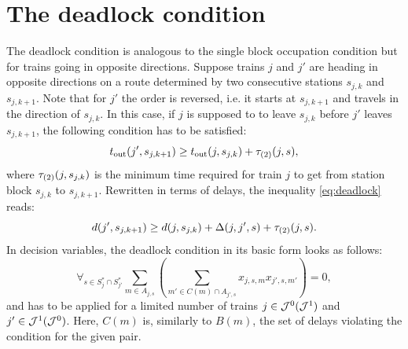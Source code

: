 \section{The deadlock condition}
The deadlock condition is analogous to the single block occupation condition
but for trains going in opposite directions. Suppose trains $j$ and $j'$ are
heading in opposite directions on a route determined by two consecutive
stations $s_{j,k}$ and $s_{j,k+1}$. Note that for $j'$ the order is reversed, i.e. it
starts at $s_{j,k+1}$ and travels in the direction of $s_{j,k}$. In this case, if $j$
is supposed to to leave $s_{j,k}$ before $j'$ leaves $s_{j,k+1}$, the following
condition has to be satisfied:
\begin{equation}
  \label{eq:deadlock}
  t_\text{out}(j', s_{j,k+1}) \ge t_\text{out}(j,s_{j,k}) + \tau_{(2)}(j, s),
\end{equation}
where $\tau_{(2)}(j, s_{j,k})$ is the minimum time required for train $j$ to
get from station block $s_{j,k}$ to $s_{j,k+1}$. Rewritten in terms of delays, the
inequality \eqref{eq:deadlock} reads:
\begin{equation}
  \label{eq:deadlock2}
  d(j',s_{j,k+1}) \ge d(j, s_{j,k}) + \Delta(j,j',s) + \tau_{(2)}(j, s).
\end{equation}
In decision variables, the deadlock condition in its basic form looks as
follows:
\begin{equation}
  \label{eq:qubo:deadlock}
  \forall_{s \in S^{*}_{j} \cap S^{*}_{j'}} \sum_{m \in A_{j, s}} \left(
  \sum_{m' \in C(m) \cap A_{j', s}} x_{j,s,m}x_{j',s,m'}
  \right) = 0,
\end{equation}
and has to be applied for a limited number of trains $j \in \mathcal{J}^{0} (\mathcal{J}^{1})$
and $j' \in \mathcal{J}^{1}(\mathcal{J}^{0})$. Here, $C(m)$ is, similarly to $B(m)$, the set of delays
violating the condition for the given pair.
